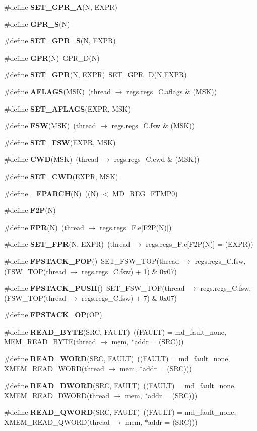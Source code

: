 \begin{CompactItemize}
\#define {\bf SET\_\-GPR\_\-A}(N, EXPR)
\item 
\#define {\bf GPR\_\-S}(N)
\item 
\#define {\bf SET\_\-GPR\_\-S}(N, EXPR)
\item 
\#define {\bf GPR}(N)~GPR\_\-D(N)
\item 
\#define {\bf SET\_\-GPR}(N, EXPR)~SET\_\-GPR\_\-D(N,EXPR)
\item 
\#define {\bf AFLAGS}(MSK)~(thread $\rightarrow$ regs.regs\_\-C.aflags \& (MSK))
\item 
\#define {\bf SET\_\-AFLAGS}(EXPR, MSK)
\item 
\#define {\bf FSW}(MSK)~(thread $\rightarrow$ regs.regs\_\-C.fsw \& (MSK))
\item 
\#define {\bf SET\_\-FSW}(EXPR, MSK)
\item 
\#define {\bf CWD}(MSK)~(thread $\rightarrow$ regs.regs\_\-C.cwd \& (MSK))
\item 
\#define {\bf SET\_\-CWD}(EXPR, MSK)
\item 
\#define {\bf \_\-FPARCH}(N)~((N) $<$ MD\_\-REG\_\-FTMP0)
\item 
\#define {\bf F2P}(N)
\item 
\#define {\bf FPR}(N)~(thread $\rightarrow$ regs.regs\_\-F.e[F2P(N)])
\item 
\#define {\bf SET\_\-FPR}(N, EXPR)~(thread $\rightarrow$ regs.regs\_\-F.e[F2P(N)] = (EXPR))
\item 
\#define {\bf FPSTACK\_\-POP}()~SET\_\-FSW\_\-TOP(thread $\rightarrow$ regs.regs\_\-C.fsw, (FSW\_\-TOP(thread $\rightarrow$ regs.regs\_\-C.fsw) + 1) \& 0x07)
\item 
\#define {\bf FPSTACK\_\-PUSH}()~SET\_\-FSW\_\-TOP(thread $\rightarrow$ regs.regs\_\-C.fsw, (FSW\_\-TOP(thread $\rightarrow$ regs.regs\_\-C.fsw) + 7) \& 0x07)
\item 
\#define {\bf FPSTACK\_\-OP}(OP)
\item 
\#define {\bf READ\_\-BYTE}(SRC, FAULT)~((FAULT) = md\_\-fault\_\-none, MEM\_\-READ\_\-BYTE(thread $\rightarrow$ mem, $\ast$addr = (SRC)))
\item 
\#define {\bf READ\_\-WORD}(SRC, FAULT)~((FAULT) = md\_\-fault\_\-none, XMEM\_\-READ\_\-WORD(thread $\rightarrow$ mem, $\ast$addr = (SRC)))
\item 
\#define {\bf READ\_\-DWORD}(SRC, FAULT)~((FAULT) = md\_\-fault\_\-none, XMEM\_\-READ\_\-DWORD(thread $\rightarrow$ mem, $\ast$addr = (SRC)))
\item 
\#define {\bf READ\_\-QWORD}(SRC, FAULT)~((FAULT) = md\_\-fault\_\-none, XMEM\_\-READ\_\-QWORD(thread $\rightarrow$ mem, $\ast$addr = (SRC)))

\end{CompactItemize}
